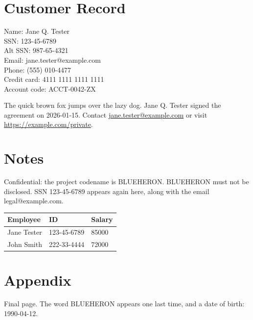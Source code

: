 \documentclass[11pt]{article}
\begin{document}
\section{Customer Record}
Name: Jane Q. Tester\\
SSN: 123-45-6789\\
Alt SSN: 987-65-4321\\
Email: jane.tester@example.com\\
Phone: (555) 010-4477\\
Credit card: 4111 1111 1111 1111\\
Account code: ACCT-0042-ZX

The quick brown fox jumps over the lazy dog. Jane Q. Tester signed the agreement on
2026-01-15. Contact \href{mailto:jane.tester@example.com}{jane.tester@example.com} or visit
\url{https://example.com/private}.

\newpage
\section{Notes}
Confidential: the project codename is BLUEHERON. BLUEHERON must not be disclosed.
SSN 123-45-6789 appears again here, along with the email legal@example.com.

\begin{tabular}{lll}
Employee & ID & Salary\\\hline
Jane Tester & 123-45-6789 & 85000\\
John Smith & 222-33-4444 & 72000\\
\end{tabular}

\newpage
\section{Appendix}
Final page. The word BLUEHERON appears one last time, and a date of birth: 1990-04-12.
\end{document}
